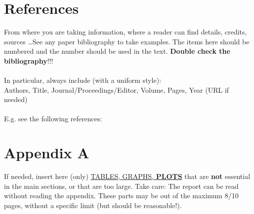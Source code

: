 \documentclass[12pt, letterpaper]{article}  %
\begin{document}
\section*{References}
From where you are taking information, where a reader can find details, credits, sources \dots See any paper bibliography to take examples. The items here should be numbered and the number should be used in the text. \textbf{Double check the bibliography}!!! \\ \\
In particular, always include (with a uniform style): \\

Authors, Title, Journal/Proceedings/Editor, Volume, Pages, Year (URL if needed) \\ \\
E.g. see the following references: 

\vspace{-1cm}

\newpage

\section*{Appendix A}
If needed, insert here (only) \underline{TABLES, GRAPHS, \textbf{PLOTS}} that are \textbf{not} essential in the main sections, or that are too large. 
Take care: The report can be read without reading the appendix. 
These parts may be out of the maximum 8/10 pages, without a specific limit (but should be reasonable!). \\ \\ 
\end{document}
